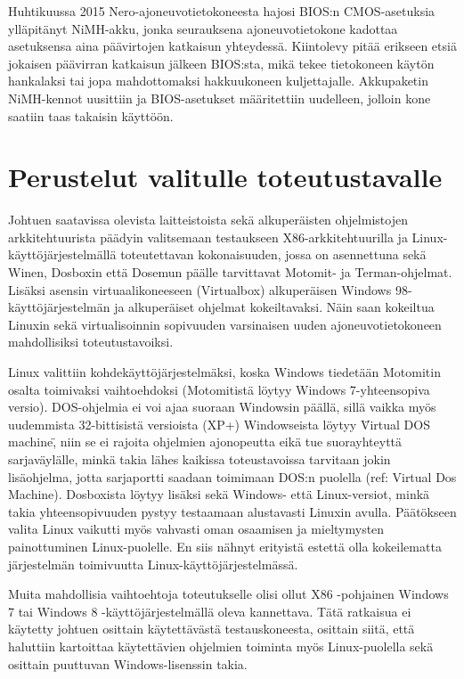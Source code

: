 \documentclass[11pt,a4paper,oneside,article]{memoir}
\begin{document}
Huhtikuussa 2015 Nero-ajoneuvotietokoneesta hajosi BIOS:n CMOS-asetuksia ylläpitänyt NiMH-akku, jonka seurauksena ajoneuvotietokone kadottaa asetuksensa aina päävirtojen katkaisun yhteydessä. Kiintolevy pitää erikseen etsiä jokaisen päävirran katkaisun jälkeen BIOS:sta, mikä tekee tietokoneen käytön hankalaksi tai jopa mahdottomaksi hakkuukoneen kuljettajalle. Akkupaketin NiMH-kennot uusittiin ja BIOS-asetukset määritettiin uudelleen, jolloin kone saatiin taas takaisin käyttöön.

\section{Perustelut valitulle toteutustavalle}

Johtuen saatavissa olevista laitteistoista sekä alkuperäisten ohjelmistojen arkkitehtuurista päädyin valitsemaan testaukseen X86-arkkitehtuurilla ja Linux-käyttöjärjestelmällä toteutettavan kokonaisuuden, jossa on asennettuna sekä Winen, Dosboxin että Dosemun päälle tarvittavat Motomit- ja Terman-ohjelmat. Lisäksi asensin virtuaalikoneeseen (Virtualbox) alkuperäisen Windows 98-käyttöjärjestelmän ja alkuperäiset ohjelmat kokeiltavaksi. Näin saan kokeiltua Linuxin sekä virtualisoinnin sopivuuden varsinaisen uuden ajoneuvotietokoneen mahdollisiksi toteutustavoiksi.

Linux valittiin kohdekäyttöjärjestelmäksi, koska Windows tiedetään Motomitin osalta toimivaksi vaihtoehdoksi (Motomitistä löytyy Windows 7-yhteensopiva versio). DOS-ohjelmia ei voi ajaa suoraan Windowsin päällä, sillä vaikka myös uudemmista 32-bittisistä versioista (XP+) Windowseista löytyy \"Virtual DOS machine\", niin se ei rajoita ohjelmien ajonopeutta eikä tue suorayhteyttä sarjaväylälle, minkä takia lähes kaikissa toteustavoissa tarvitaan jokin lisäohjelma, jotta sarjaportti saadaan toimimaan DOS:n puolella (ref: Virtual Dos Machine). Dosboxista löytyy lisäksi sekä Windows- että Linux-versiot, minkä takia yhteensopivuuden pystyy testaamaan alustavasti Linuxin avulla. Päätökseen valita Linux vaikutti myös vahvasti oman osaamisen ja mieltymysten painottuminen Linux-puolelle. En siis nähnyt erityistä estettä olla kokeilematta järjestelmän toimivuutta Linux-käyttöjärjestelmässä.

Muita mahdollisia vaihtoehtoja toteutukselle olisi ollut X86 -pohjainen Windows 7 tai Windows 8 -käyttöjärjestelmällä oleva kannettava. Tätä ratkaisua ei käytetty johtuen osittain käytettävästä testauskoneesta, osittain siitä, että haluttiin kartoittaa käytettävien ohjelmien toiminta myös Linux-puolella sekä osittain puuttuvan Windows-lisenssin takia.
\end{document}
